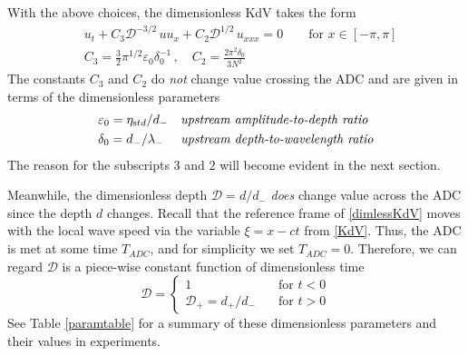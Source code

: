 \documentclass[11pt]{article}
\newcommand{\eps}{\varepsilon}
\newcommand{\etastd}{\eta_{\text std}}
\newcommand{\depth}{d}
\newcommand{\dup}{\depth_{-}}
\newcommand{\ddn}{\depth_{+}}
\newcommand{\lam}{\lambda}
\newcommand{\lamup}{\lam_{-}}
\newcommand{\lamfac}{N}
\newcommand{\drat}{\mathcal{D}}
\newcommand{\dratdn}{\drat_+}
\newcommand{\epsup}{\eps_0}
\newcommand{\delup}{\delta_0}
\begin{document}
With the above choices, the dimensionless KdV takes the form
\begin{align}
\label{dimlessKdV}
&u_t + C_3 \drat^{-3/2} \, u u_x + C_2 \drat^{1/2} \, u_{xxx} = 0
\qquad \text{for } x \in [-\pi,\pi] \\
&C_3 = \frac{3}{2} \pi^{1/2} \epsup \delup^{-1} \, , \quad
C_2 = \frac{2 \pi^2 \delup}{3 \lamfac^2} 
\end{align}
The constants $C_3$ and $C_2$ do {\em not} change value crossing the ADC and are given in terms of the dimensionless parameters
\begin{align}
&\epsup = \etastd / \dup
&&\mbox{\em upstream amplitude-to-depth ratio} \\
&\delup = \dup / \lamup
&&\mbox{\em upstream depth-to-wavelength ratio}
\end{align}
The reason for the subscripts $3$ and $2$ will become evident in the next section. 

Meanwhile, the dimensionless depth $\drat = {\depth}/{\dup}$ {\em does} change value across the ADC since the depth $\depth$ changes. Recall that the reference frame of \eqref{dimlessKdV} moves with the local wave speed via the variable $\xi = x-ct$ from \eqref{KdV}. Thus, the ADC is met at some time $T_{ADC}$, and for simplicity we set $T_{ADC} = 0$. Therefore, we can regard $\drat$ is a piece-wise constant function of dimensionless time
\begin{equation}
\label{dratpw}
\drat = 
\begin{cases}
1 		&\quad \mbox{for } {t}<0 \\
\dratdn = {\ddn}/{\dup} 	&\quad \mbox{for } {t}>0
\end{cases}
\end{equation}
See Table \ref{paramtable} for a summary of these dimensionless parameters and their values in experiments.
\end{document}
